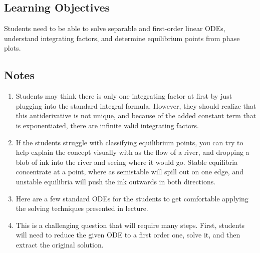\subsection*{Learning Objectives}
Students need to be able to solve separable and first-order linear ODEs, understand integrating factors, and determine equilibrium points from phase plots.


\subsection*{Notes}
\begin{enumerate}
    \item Students may think there is only one integrating factor at first by just plugging into the standard integral formula. However, they should realize that this antiderivative is not unique, and because of the added constant term that is exponentiated, there are infinite valid integrating factors.
    \item If the students struggle with classifying equilibrium points, you can try to help explain the concept visually with as the flow of a river, and dropping a blob of ink into the river and seeing where it would go. Stable equilibria concentrate at a point, where as semistable will spill out on one edge, and unstable equilibria will push the ink outwards in both directions.
    \item Here are a few standard ODEs for the students to get comfortable applying the solving techniques presented in lecture.
    \item This is a challenging question that will require many steps. First, students will need to reduce the given ODE to a first order one, solve it, and then extract the original solution.
\end{enumerate}


